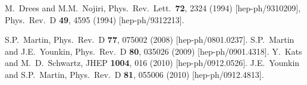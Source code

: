 \documentclass[12pt]{article}
\begin{document}
\begin{thebibliography}{999}




  M.~Drees and M.M.~Nojiri,
  Phys.\ Rev.\ Lett.\  {\bf 72}, 2324 (1994)
  [hep-ph/9310209],
  Phys.\ Rev.\  D {\bf 49}, 4595 (1994)
  [hep-ph/9312213].

  S.P.~Martin,
  Phys.\ Rev.\  D {\bf 77}, 075002 (2008)
  [hep-ph/0801.0237].
S.P.~Martin and J.E.~Younkin,
  Phys.\ Rev.\  D {\bf 80}, 035026 (2009)
  [hep-ph/0901.4318].
Y.~Kats and M.~D.~Schwartz,
  JHEP {\bf 1004}, 016 (2010)
  [hep-ph/0912.0526].
J.E.~Younkin and S.P.~Martin,
  Phys.\ Rev.\  D {\bf 81}, 055006 (2010)
  [hep-ph/0912.4813].




\end{thebibliography}
\end{document}
